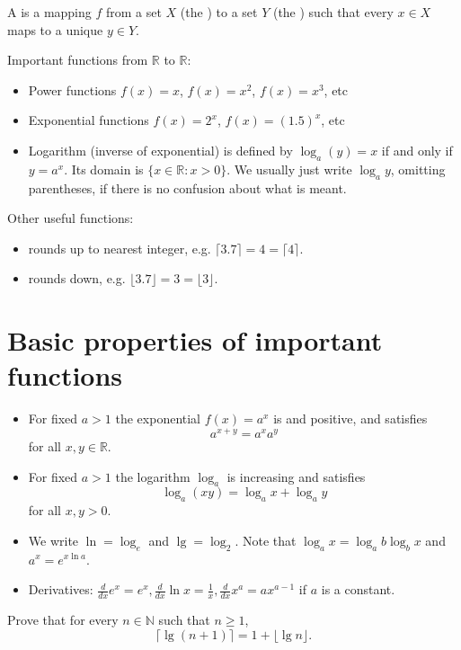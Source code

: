 A  is a mapping $f$ from a set $X$ (the ) to a set $Y$ (the ) such that every $x\in X$ maps to a unique $y\in Y$.

Important functions from $\mathbb{R}$ to $\mathbb{R}$: 
\begin{itemize}
\item Power functions $f(x) = x$, $f(x) = x^2$, $f(x) = x^3$, etc
\item Exponential functions $f(x) = 2^x$, $f(x) = (1.5)^x$, etc
\item Logarithm (inverse of exponential) is defined by $\log_a (y) = x$ if and only if $y = a^x$. Its domain is $\{x\in \mathbb{R} : x > 0\}$. We usually just write $\log_a y$, omitting parentheses, if there is no confusion about what is meant.
\end{itemize}

Other useful functions: 
\begin{itemize}
\item {} rounds up to nearest integer, e.g. $\lceil 3.7 \rceil = 4 = \lceil 4 \rceil$. 
\item {} rounds down, e.g. $\lfloor 3.7 \rfloor= 3 = \lfloor 3 \rfloor$.
\end{itemize}



\section{Basic properties of important functions}
\begin{itemize}
\item For fixed $a>1$ the exponential $f(x) = a^x$ is  and positive, and satisfies $$a^{x+y} = a^x a^y$$ for all $x,y\in \mathbb{R}$. 
\item For fixed $a>1$ the logarithm $\log_a$ is increasing and satisfies 
$$\log_a(xy) = \log_a x + \log_a y$$ for all $x,y>0$.
\item We write $\ln = \log_e$ and $\lg = \log_2$. Note that $\log_a x = \log_a b \log_b x$ and $a^x = e^{x\ln a}$.
\item Derivatives: $\frac{d}{dx} e^x = e^x, \frac{d}{dx} \ln x = \frac{1}{x},  \frac{d}{dx} x^a = ax^{a-1}$ if $a$ is a constant.
\end{itemize}

\begin{Boxample}[4]
Prove that for every $n\in \mathbb{N}$ such that $n\geq 1$,
$$
\lceil \lg (n+1) \rceil = 1 + \lfloor \lg n \rfloor.
$$

\end{Boxample}

